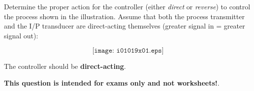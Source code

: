 

Determine the proper action for the controller (either {\it direct} or {\it reverse}) to control the process shown in the illustration.  Assume that both the process transmitter and the I/P transducer are direct-acting themselves (greater signal in = greater signal out):

$$\texttt{[image: i01019x01.eps]}$$







The controller should be {\bf direct-acting}.







{\bf This question is intended for exams only and not worksheets!}.



